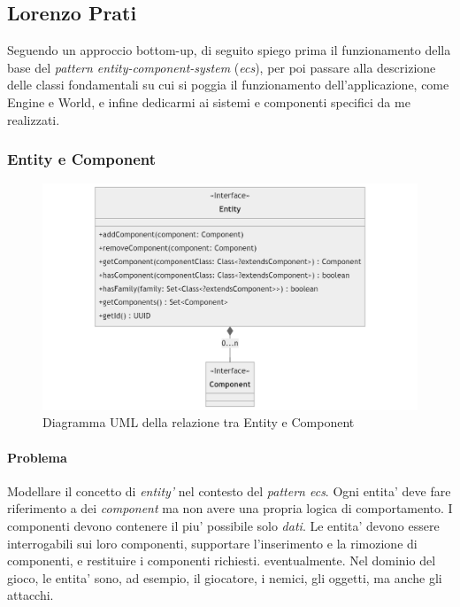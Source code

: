 \documentclass[a4paper,12pt]{report}
\begin{document}
\subsection{Lorenzo Prati}

Seguendo un approccio bottom-up, di seguito spiego prima il funzionamento della base del \textit{pattern entity-component-system} (\textit{ecs}), per poi passare alla descrizione delle classi fondamentali su cui si poggia il funzionamento dell'applicazione, come Engine e World, e infine dedicarmi ai sistemi e componenti specifici da me realizzati.

\subsubsection{Entity e Component}

\begin{figure}[h]
	\centering
	\includegraphics[width=\textwidth]{uml/uml_entity_component.png}
	\caption{Diagramma UML della relazione tra Entity e Component}
	\label{img:badarch}
\end{figure}

\paragraph{Problema}
Modellare il concetto di \textit{entity'} nel contesto del \textit{pattern ecs}. Ogni entita' deve fare riferimento a dei \textit{component} ma non avere una propria logica di comportamento. I componenti devono contenere il piu' possibile solo \textit{dati}. Le entita' devono essere interrogabili sui loro componenti, supportare l'inserimento e la rimozione di componenti, e restituire i componenti richiesti. eventualmente. Nel dominio del gioco, le entita' sono, ad esempio, il giocatore, i nemici, gli oggetti, ma anche gli attacchi.
\end{document}
